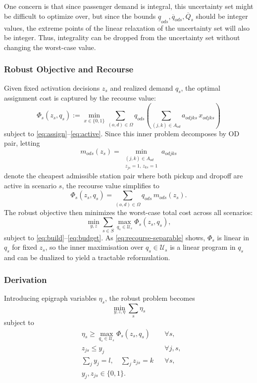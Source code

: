 \documentclass[11pt]{article}
\newcommand{\cU}{\mathcal{U}}
\theoremstyle{definition}
\begin{document}
One concern is that since passenger demand is integral, this uncertainty set might be difficult to optimize over, but since the bounds $\underline{q}_{ods}, \overline{q}_{ods}, \overline{Q}_{s}$ should be integer values, the extreme points of the linear relaxation of the uncertainty set will also be integer. Thus, integrality can be dropped from the uncertainty set without changing the worst-case value.

\subsubsection{Robust Objective and Recourse}

Given fixed activation decisions $z_s$ and realized demand $q_s$, the optimal
assignment cost is captured by the recourse value:
\begin{equation}
	\Phi_s(z_s,q_s)
	:=
	\min_{x \in \{0,1\}}
	\sum_{(o,d)\in\Omega}
	q_{ods}
	\left(\sum_{(j,k)\in A_{od}}
	a_{odjks}\,x_{odjks}\right)
	\label{eq:recourse-value}
\end{equation}
subject to \eqref{eq:assign}--\eqref{eq:active}. Since this inner problem
decomposes by OD pair, letting
\[
	m_{ods}(z_s) = \min_{\substack{(j,k)\in A_{od} \\ z_{js}=1,\, z_{ks}=1}} a_{odjks}
\]
denote the cheapest admissible station pair where both pickup and dropoff are
active in scenario $s$, the recourse value simplifies to
\begin{equation}
	\Phi_s(z_s,q_s)
	=
	\sum_{(o,d)\in\Omega} q_{ods}\,m_{ods}(z_s).
	\label{eq:recourse-separable}
\end{equation}
The robust objective then minimizes the worst-case total cost across all
scenarios:
\begin{equation}
	\min_{y,z}
	\sum_{s \in S}
	\max_{q_s \in \cU_s}
	\Phi_s(z_s,q_s),
	\label{eq:robust-obj}
\end{equation}
subject to \eqref{eq:build}--\eqref{eq:budget}. As \eqref{eq:recourse-separable}
shows, $\Phi_s$ is linear in $q_s$ for fixed $z_s$, so the inner maximisation
over $q_s \in \cU_s$ is a linear program in $q_s$ and can be dualized to yield
a tractable reformulation.

\subsubsection{Derivation}

Introducing epigraph variables $\eta_s$, the robust problem becomes
\begin{equation}
	\min_{y,z,\eta} \sum_{s} \eta_s
	\label{eq:robust-epi}
\end{equation}
subject to
\begin{align*}
	 & \eta_s \ge \max_{q_s \in \cU_s} \Phi_s(z_s,q_s) &  & \forall s,   \\
	 & z_{js} \le y_j                                  &  & \forall j,s, \\
	 & \sum_j y_j = l,\quad \sum_j z_{js} = k          &  & \forall s,   \\
	 & y_j, z_{js} \in \{0,1\}.
\end{align*}
\end{document}
